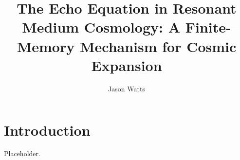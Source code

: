 \documentclass[a4paper,11pt]{article}
\title{The Echo Equation in Resonant Medium Cosmology: A Finite-Memory Mechanism for Cosmic Expansion}
\author[a]{Jason Watts}
\affiliation[a]{The Experimentalist Lab}
\begin{document}
\maketitle\flushbottom
\section{Introduction}
Placeholder.
\end{document}
